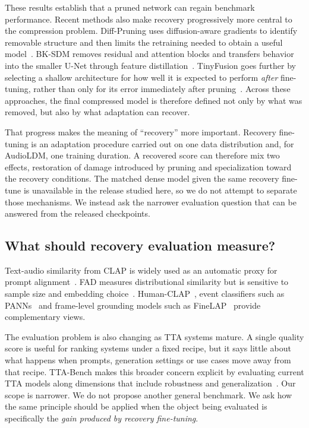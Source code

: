 \documentclass{article}
\begin{document}
These results establish that a pruned network can regain benchmark performance. Recent methods also make recovery progressively more central to the compression problem. Diff-Pruning uses diffusion-aware gradients to identify removable structure and then limits the retraining needed to obtain a useful model~\cite{fang2023diffpruning}. BK-SDM removes residual and attention blocks and transfers behavior into the smaller U-Net through feature distillation~\cite{kim2024bksdm}. TinyFusion goes further by selecting a shallow architecture for how well it is expected to perform \emph{after} fine-tuning, rather than only for its error immediately after pruning~\cite{fang2025tinyfusion}. Across these approaches, the final compressed model is therefore defined not only by what was removed, but also by what adaptation can recover.

That progress makes the meaning of ``recovery'' more important. Recovery fine-tuning is an adaptation procedure carried out on one data distribution and, for AudioLDM, one training duration. A recovered score can therefore mix two effects, restoration of damage introduced by pruning and specialization toward the recovery conditions. The matched dense model given the same recovery fine-tune is unavailable in the release studied here, so we do not attempt to separate those mechanisms. We instead ask the narrower evaluation question that can be answered from the released checkpoints.

\subsection{What should recovery evaluation measure?}
Text-audio similarity from CLAP is widely used as an automatic proxy for prompt alignment~\cite{wu2023clap,huang2023makeanaudio,ghosal2023tango}. FAD measures distributional similarity but is sensitive to sample size and embedding choice~\cite{kilgour2019fad,gui2024fad,chung2025kad}. Human-CLAP~\cite{takano2025humanclap}, event classifiers such as PANNs~\cite{kong2020panns} and frame-level grounding models such as FineLAP~\cite{li2026finelap} provide complementary views.

The evaluation problem is also changing as TTA systems mature. A single quality score is useful for ranking systems under a fixed recipe, but it says little about what happens when prompts, generation settings or use cases move away from that recipe. TTA-Bench makes this broader concern explicit by evaluating current TTA models along dimensions that include robustness and generalization~\cite{wang2026ttabench}. Our scope is narrower. We do not propose another general benchmark. We ask how the same principle should be applied when the object being evaluated is specifically the \emph{gain produced by recovery fine-tuning}.
\end{document}
